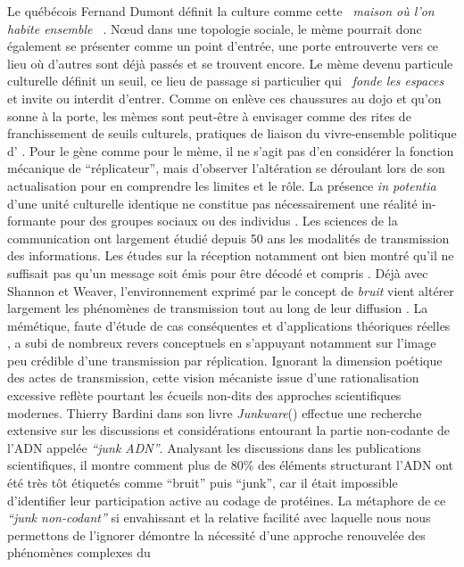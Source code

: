  Le québécois Fernand Dumont définit la culture comme cette \textit{{\guillemotleft}~maison o\`u l{\textquoteright}on habite ensemble~{\guillemotright} }\citep{Dumont1993}. N{\oe}ud dans une topologie sociale, le mème pourrait donc également se présenter comme un point d{\textquoteright}entrée, une porte entrouverte vers ce lieu o\`u d{\textquoteright}autres sont déjà passés et se trouvent encore. Le mème devenu particule culturelle définit un seuil, ce lieu de passage si particulier qui \textit{{\guillemotleft}~fonde les espaces~{\guillemotright}} \citep{Bonnin2000} et invite ou interdit d{\textquoteright}entrer. Comme on enlève ces chaussures au dojo et qu{\textquoteright}on sonne à la porte, les mèmes sont peut-être à envisager comme des rites de franchissement de seuils culturels, pratiques de liaison du vivre-ensemble politique d{\textquoteright} \cite{Arendt1995} . Pour le gène comme pour le mème, il ne s{\textquoteright}agit pas d'en considérer la fonction mécanique de {\textquotedblleft}réplicateur{\textquotedblright}, mais d{\textquoteright}observer l{\textquoteright}altération se déroulant lors de son actualisation pour en comprendre les limites et le rôle. La présence \textit{in potentia} d{\textquoteright}une unité culturelle identique ne constitue pas nécessairement une réalité in-formante pour des groupes sociaux ou des individus \citep{Lissack2004}. Les sciences de la communication ont largement étudié depuis 50 ans les modalités de transmission des informations. Les études sur la réception notamment ont bien montré qu{\textquoteright}il ne suffisait pas qu{\textquoteright}un message soit émis pour être décodé et compris \citep{Liebes1990}. Déjà avec Shannon et Weaver, l{\textquoteright}environnement exprimé par le concept de\textit{ bruit }vient altérer largement les phénomènes de transmission tout au long de leur diffusion \citep{Attali1978}. La mémétique, faute d{\textquoteright}étude de cas conséquentes et d{\textquoteright}applications théoriques réelles \citep{Jouxtel2014}, a subi de nombreux revers conceptuels en s{\textquoteright}appuyant notamment sur l{\textquoteright}image peu crédible d{\textquoteright}une transmission par réplication. Ignorant la dimension poétique des actes de transmission, cette vision mécaniste issue d{\textquoteright}une rationalisation excessive reflète pourtant les écueils non-dits des approches scientifiques modernes. Thierry Bardini dans son livre \textit{Junkware}(\citeyear{Bardini2011}) effectue une recherche extensive sur les discussions et considérations entourant la partie non-codante de l{\textquoteright}ADN appelée \textit{{\textquotedblleft}junk ADN{\textquotedblright}}. Analysant les discussions dans les publications scientifiques, il montre comment plus de 80\% des éléments structurant l{\textquoteright}ADN ont été très tôt étiquetés comme {\textquotedblleft}bruit{\textquotedblright} puis {\textquotedblleft}junk{\textquotedblright}, car il était impossible d{\textquoteright}identifier leur participation active au codage de protéines. La métaphore de ce \textit{{\textquotedblleft}junk non-codant{\textquotedblright} }si envahissant et la relative facilité avec laquelle nous nous permettons de l{\textquoteright}ignorer démontre la nécessité d{\textquoteright}une approche renouvelée des phénomènes complexes du 